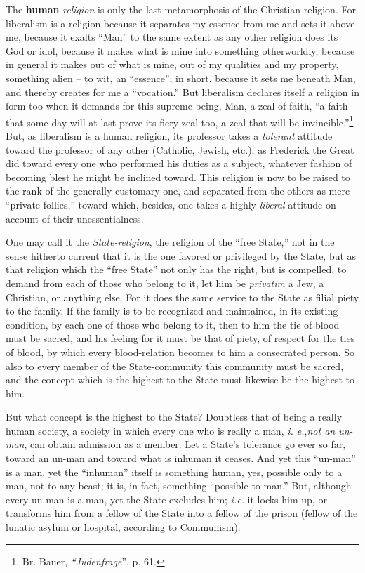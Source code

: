 \documentclass[12pt,a4paper]{book}
\begin{document}
The \textbf{human} \textit{religion} is only the last metamorphosis of the 
Christian religion. For liberalism is a religion because it separates my 
essence from me and sets it above me, because it exalts ``Man'' to the same 
extent as any other religion does its God or idol, because it makes what is 
mine into something otherworldly, because in general it makes out of what is 
mine, out of my qualities and my property, something alien -- to wit, an 
``essence''; in short, because it sets me beneath Man, and thereby creates 
for me a ``vocation.'' But liberalism declares itself a religion in form too 
when it demands for this supreme being, Man, a zeal of faith, ``a faith that 
some day will at last prove its fiery zeal too, a zeal that will be 
invincible.''\footnote{Br. Bauer, \textit{``Judenfrage}'', p. 61.} But, as 
liberalism is a human religion, its professor takes a \textit{tolerant} 
attitude toward the professor of any other (Catholic, Jewish, etc.), as 
Frederick the Great did toward every one who performed his duties as a 
subject, whatever fashion of becoming blest he might be inclined toward. This 
religion is now to be raised to the rank of the generally customary one, and 
separated from the others as mere ``private follies,'' toward which, 
besides, one takes a highly \textit{liberal} attitude on account of their 
unessentialness.

One may call it the \textit{State-religion}, the religion of the ``free 
State,'' not in the sense hitherto current that it is the one favored or 
privileged by the State, but as that religion which the ``free State'' not 
only has the right, but is compelled, to demand from each of those who belong 
to it, let him be \textit{privatim} a Jew, a Christian, or anything else. For 
it does the same service to the State as filial piety to the family. If the 
family is to be recognized and maintained, in its existing condition, by each 
one of those who belong to it, then to him the tie of blood must be sacred, 
and his feeling for it must be that of piety, of respect for the ties of 
blood, by which every blood-relation becomes to him a consecrated person. So 
also to every member of the State-community this community must be sacred, and 
the concept which is the highest to the State must likewise be the highest to 
him.

But what concept is the highest to the State? Doubtless that of being a really 
human society, a society in which every one who is really a man, \textit{i. 
e.},\textit{not an un-man}, can obtain admission as a member. Let a State's 
tolerance go ever so far, toward an un-man and toward what is inhuman it 
ceases. And yet this ``un-man'' is a man, yet the ``inhuman'' itself is 
something human, yes, possible only to a man, not to any beast; it is, in 
fact, something ``possible to man.'' But, although every un-man is a man, 
yet the State excludes him; \textit{i.e.} it locks him up, or transforms him 
from a fellow of the State into a fellow of the prison (fellow of the lunatic 
asylum or hospital, according to Communism).
\end{document}
